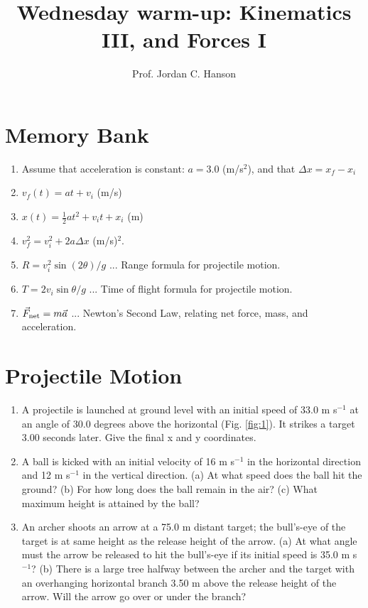 \documentclass{article}
\begin{document}
\twocolumn

\title{Wednesday warm-up: Kinematics III, and Forces I}
\author{Prof. Jordan C. Hanson}

\maketitle

\section{Memory Bank}

\begin{enumerate}
\item Assume that acceleration is constant: $a = 3.0$ (m/s$^2$), and that $\Delta x = x_f - x_i$
\item $v_f(t) = at + v_{i}$ (m/s)
\item $x(t) = \frac{1}{2}at^2 + v_{i} t + x_{i}$ (m)
\item $v_f^2 = v_i^2 + 2a\Delta x$ (m/s)$^2$.
\item $R = v_i^2 \sin(2\theta)/g$ ... Range formula for projectile motion.
\item $T = 2v_i\sin\theta/g$ ... Time of flight formula for projectile motion.
\item $\vec{F}_{\rm net} = m \vec{a}$ ... Newton's Second Law, relating net force, mass, and acceleration.
\end{enumerate}

\section{Projectile Motion}

\begin{enumerate}
\item A projectile is launched at ground level with an initial speed of 33.0 m s$^{-1}$ at an angle of 30.0 degrees above the horizontal (Fig. \ref{fig:1}). It strikes a target 3.00 seconds later.  Give the final x and y coordinates. \\ \vspace{3cm}
\item A ball is kicked with an initial velocity of 16 m s$^{-1}$ in the horizontal direction and 12 m s$^{-1}$ in the vertical direction. (a) At what speed does the ball hit the ground? (b) For how long does the ball remain in the air? (c) What maximum height is attained by the ball? \\ \vspace{3cm}
\item An archer shoots an arrow at a 75.0 m distant target; the bull's-eye of the target is at same height as the release height of the arrow. (a) At what angle must the arrow be released to hit the bull’s-eye if its initial speed is 35.0 m s$^{-1}$? (b) There is a large tree halfway between the archer and the target with an overhanging horizontal branch 3.50 m above the release height of the arrow. Will the arrow go over or under the branch? \\ \vspace{3cm}
\end{enumerate}
\end{document}
